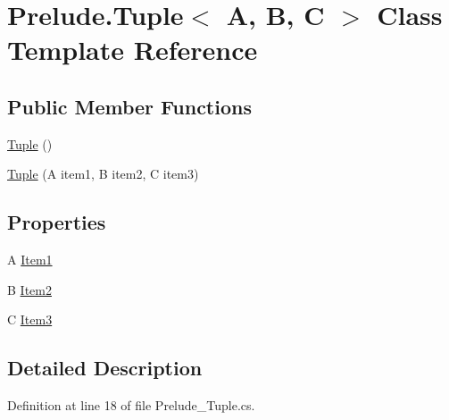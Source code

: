 \hypertarget{class_prelude_1_1_tuple_3_01_a_00_01_b_00_01_c_01_4}{\section{Prelude.\+Tuple$<$ A, B, C $>$ Class Template Reference}
\label{class_prelude_1_1_tuple_3_01_a_00_01_b_00_01_c_01_4}
}
\subsection*{Public Member Functions}
\begin{DoxyCompactItemize}
\item 
\hyperlink{class_prelude_1_1_tuple_3_01_a_00_01_b_00_01_c_01_4_a02249d8b55b2ae05c915d119751539a7}{Tuple} ()
\item 
\hyperlink{class_prelude_1_1_tuple_3_01_a_00_01_b_00_01_c_01_4_a33d952f54a09a48ab69e987a6cff4b2c}{Tuple} (A item1, B item2, C item3)
\end{DoxyCompactItemize}
\subsection*{Properties}
\begin{DoxyCompactItemize}
\item 
A \hyperlink{class_prelude_1_1_tuple_3_01_a_00_01_b_00_01_c_01_4_a6ee09a243d2e73752828a75242e515c1}{Item1}
\item 
B \hyperlink{class_prelude_1_1_tuple_3_01_a_00_01_b_00_01_c_01_4_a8f1818519e4e1f6926f65910ef986be9}{Item2}
\item 
C \hyperlink{class_prelude_1_1_tuple_3_01_a_00_01_b_00_01_c_01_4_a5fc282d403a3721429e4a11dfcb9855b}{Item3}
\end{DoxyCompactItemize}


\subsection{Detailed Description}


Definition at line 18 of file Prelude\+\_\+\+Tuple.\+cs.



